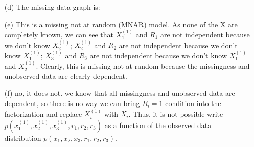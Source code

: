\documentclass[11pt]{article}
\begin{document}
\begin{answertext}{22cm}{}
\begin{enumerate}
\item[(d)]The missing data graph is:\\
\begin{center}
\end{center}

\item[(e)]This is a missing not at random (MNAR) model. As none of the X are completely known, we can see that $X_1^{(1)}$ and $R_1$ are not independent because we don't know $X_2^{(1)}$; $X_2^{(1)}$ and $R_2$ are not independent because we don't know $X_1^{(1)}$; $X_3^{(1)}$ and $R_3$ are not independent because we don't know $X_1^{(1)}$ and $X_2^{(1)}$. Clearly, this is missing not at random because the missingness and unobserved data are clearly dependent.

\item[(f)]no, it does not. we know that all missingness and unobserved data are dependent, so there is no way we can bring $R_i=1$ condition into the factorization and replace $X_i^{(1)}$ with $X_i$. Thus, it is not possible write $p(x_1^{(1)}, x_2^{(1)}, x_3^{(1)}, r_1, r_2, r_3)$ as a function of the observed data distribution $p(x_1, x_2, x_3, r_1, r_2, r_3)$.

\end{enumerate}
\end{answertext} 
\end{document}
